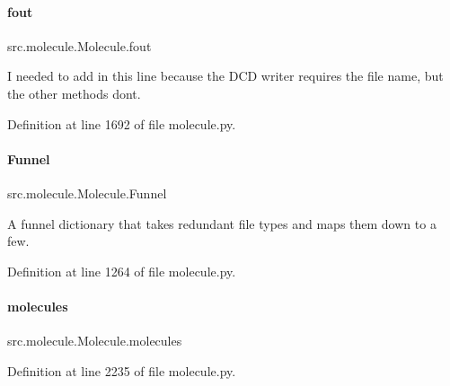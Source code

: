 \paragraph{\texorpdfstring{fout}{fout}}
{\footnotesize\ttfamily src.\+molecule.\+Molecule.\+fout}



I needed to add in this line because the D\+CD writer requires the file name, but the other methods don\textquotesingle{}t. 



Definition at line 1692 of file molecule.\+py.

\mbox{\label{classsrc_1_1molecule_1_1Molecule_a56e223f4d0b5bf391e7d038b36d335d8}} 
\paragraph{\texorpdfstring{Funnel}{Funnel}}
{\footnotesize\ttfamily src.\+molecule.\+Molecule.\+Funnel}



A funnel dictionary that takes redundant file types and maps them down to a few. 



Definition at line 1264 of file molecule.\+py.

\mbox{\label{classsrc_1_1molecule_1_1Molecule_a91b5115334f638c29d7a1cc46aedca5d}} 
\paragraph{\texorpdfstring{molecules}{molecules}}
{\footnotesize\ttfamily src.\+molecule.\+Molecule.\+molecules}



Definition at line 2235 of file molecule.\+py.

\mbox{\label{classsrc_1_1molecule_1_1Molecule_aa6fbbf278cf844c7bbdac896c71f5c64}} 
